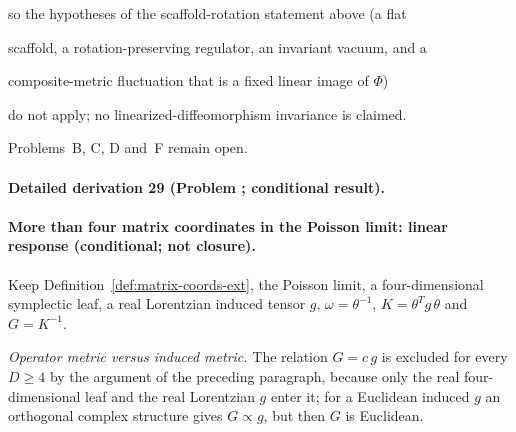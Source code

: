 so the hypotheses of the scaffold-rotation statement above (a flat

scaffold, a rotation-preserving regulator, an invariant vacuum, and a

composite-metric fluctuation that is a fixed linear image of \(\Phi\))

do not apply; no linearized-diffeomorphism invariance is claimed.

Problems~B, C, D and~F remain open.



\paragraph{Detailed derivation 29 (Problem ; conditional result).} \label{ref:detail-28} %



\paragraph{More than four matrix coordinates in the Poisson limit: linear response (conditional; not closure).}

Keep Definition~\ref{def:matrix-coords-ext}, the Poisson limit, a four-dimensional symplectic leaf, a real Lorentzian induced tensor \(g\), \(\omega=\theta^{-1}\), \(K=\theta^{T}g\,\theta\) and \(G=K^{-1}\).



\emph{Operator metric versus induced metric.} The relation \(G=c\,g\) is excluded for every \(D\ge4\) by the argument of the preceding paragraph, because only the real four-dimensional leaf and the real Lorentzian \(g\) enter it; for a Euclidean induced \(g\) an orthogonal complex structure gives \(G\propto g\), but then \(G\) is Euclidean.



